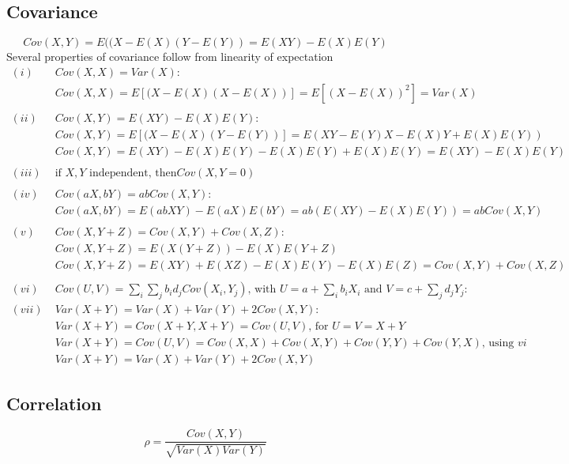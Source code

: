 \documentclass{article}
\begin{document}
\subsection{Covariance}
\begin{equation*}
    Cov(X, Y) = E((X - E(X)(Y - E(Y)) = E(XY) - E(X)E(Y)
\end{equation*}
Several properties of covariance follow from linearity of expectation
\begin{align*}
    (i) \; & Cov(X, X) = Var(X):\\
    & Cov(X, X) = E[(X - E(X)(X - E(X))] = E[(X - E(X))^2] = Var(X)\\ \\
    (ii) \; & Cov(X, Y) = E(XY) - E(X)E(Y):\\
    & Cov(X, Y) = E[(X - E(X)(Y - E(Y))] = E(XY - E(Y)X - E(X)Y + E(X)E(Y)) \\ 
    & Cov(X, Y) = E(XY) - E(X)E(Y) - E(X)E(Y) + E(X)E(Y) = E(XY) - E(X)E(Y)\\ \\
    (iii) \; & \textrm{if $X, Y$ independent, then} Cov(X, Y = 0)\\ \\
    (iv) \; & Cov(aX, bY) = abCov(X, Y):\\
    & Cov(aX, bY)= E(abXY) - E(aX)E(bY) = ab(E(XY) - E(X)E(Y)) = abCov(X, Y) \\ \\
    (v)\; & Cov(X, Y+Z) = Cov(X, Y) + Cov(X, Z):\\
    & Cov(X, Y+Z) = E(X(Y+Z)) - E(X)E(Y+Z) \\
    & Cov(X, Y+Z) = E(XY) + E(XZ) - E(X)E(Y) - E(X)E(Z) = Cov(X, Y) + Cov(X, Z)\\ \\
    (vi)\; & Cov(U, V) = \sum_i \sum_j b_id_jCov(X_i, Y_j) \textrm{, with } U = a + \sum_i b_iX_i \textrm{ and } V = c + \sum_j d_j Y_j:\\
    (vii)\; & Var(X + Y) = Var(X) + Var(Y) + 2Cov(X, Y):\\
    & Var (X + Y) = Cov(X+Y, X+Y) = Cov(U, V) \textrm{, for } U = V = X+Y \\
    & Var (X + Y) = Cov(U, V) = Cov(X, X) + Cov(X, Y) + Cov(Y, Y) + Cov(Y, X) \textrm{, using $vi$} \\
    & Var (X + Y) = Var(X) + Var(Y) + 2Cov(X, Y) 
\end{align*}

\subsection{Correlation}
\begin{equation*}
    \rho = \frac{Cov(X, Y)}{\sqrt{Var(X)Var(Y)}}
\end{equation*}
\end{document}
